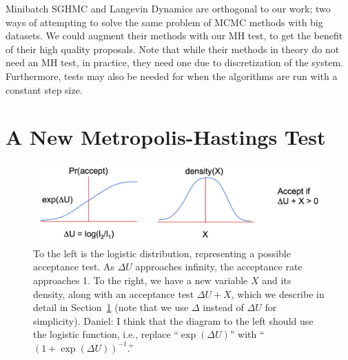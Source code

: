 \documentclass{article}
\begin{document}
Minibatch SGHMC and Langevin Dynamics are orthogonal to our work; two ways of attempting
to solve the same problem of MCMC methods with big datasets. We could augment their methods with our
MH test, to get the benefit of their high quality proposals. Note that while their methods in theory
do not need an MH test, in practice, they need one due to discretization of the system. Furthermore,
    tests may also be needed for when the algorithms are run with a constant step size.





\section{A New Metropolis-Hastings Test}\label{sec:our_algorithm}

\begin{figure}[t]
  \centering
  \includegraphics[width=\textwidth]{john_bair_fig01}
  \caption{
  To the left is the logistic distribution, representing a possible acceptance test. As $\Delta U$
  approaches infinity, the acceptance rate approaches 1. To the right, we have a new variable $X$
  and its density, along with an acceptance test $\Delta U + X$, which we describe in detail in
  Section~\ref{sec:our_algorithm} (note that we use $\Delta$ instead of $\Delta U$ for simplicity).
  {\color{blue}
  Daniel: I think that the diagram to the left should use the logistic function, i.e., replace
  ``$\exp(\Delta U)$'' with ``$(1+\exp(\Delta U))^{-1}$.''
  }
  }
  \label{fig:part1}
\end{figure}
\end{document}
